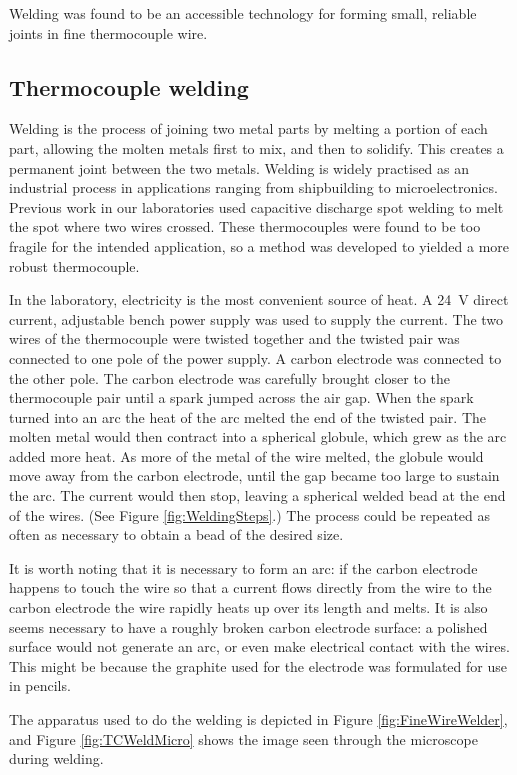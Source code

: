 Welding was found to be an accessible technology for forming small, reliable
joints in fine thermocouple wire.

\subsection{Thermocouple welding}

Welding is the process of joining two metal parts by melting a portion of each
part, allowing the molten metals first to mix, and then to solidify. This
creates a permanent joint between the two metals. Welding is widely practised as
an industrial process in applications ranging from shipbuilding to
microelectronics. Previous work in our laboratories used capacitive discharge
spot welding to melt the spot where two wires crossed. These thermocouples were
found to be too fragile for the intended application, so a method was developed
to yielded a more robust thermocouple.

In the laboratory, electricity is the most convenient source of heat. A
\SI{24}{\volt} direct current, adjustable bench power supply was used to supply
the current. The two wires of the thermocouple were twisted together and the
twisted pair was connected to one pole of the power supply. A carbon electrode
was connected to the other pole. The carbon electrode was carefully brought
closer to the thermocouple pair until a spark jumped across the air gap. When
the spark turned into an arc the heat of the arc melted the end of the twisted
pair. The molten metal would then contract into a spherical globule, which grew
as the arc added more heat. As more of the metal of the wire melted, the globule
would move away from the carbon electrode, until the gap became too large to
sustain the arc. The current would then stop, leaving a spherical welded bead at
the end of the wires. (See Figure \ref{fig:WeldingSteps}.) The process could be
repeated as often as necessary to obtain a bead of the desired size.

It is worth noting that it is necessary to form an arc: if the carbon electrode
happens to touch the wire so that a current flows directly from the wire to the
carbon electrode the wire rapidly heats up over its length and melts. It is also
seems necessary to have a roughly broken carbon electrode surface: a polished
surface would not generate an arc, or even make electrical contact with the
wires. This might be because the graphite used for the electrode was formulated
for use in pencils.

The apparatus used to do the welding is depicted in Figure
\ref{fig:FineWireWelder}, and Figure \ref{fig:TCWeldMicro} shows the image seen
through the microscope during welding.

